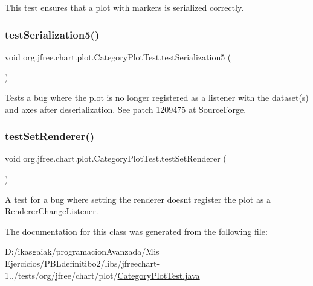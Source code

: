 This test ensures that a plot with markers is serialized correctly. \mbox{\label{classorg_1_1jfree_1_1chart_1_1plot_1_1_category_plot_test_a8caf2a503b37538507e3f8e52a79a802}} 
\subsubsection{\texorpdfstring{test\+Serialization5()}{testSerialization5()}}
{\footnotesize\ttfamily void org.\+jfree.\+chart.\+plot.\+Category\+Plot\+Test.\+test\+Serialization5 (\begin{DoxyParamCaption}{ }\end{DoxyParamCaption})}

Tests a bug where the plot is no longer registered as a listener with the dataset(s) and axes after deserialization. See patch 1209475 at Source\+Forge. \mbox{\label{classorg_1_1jfree_1_1chart_1_1plot_1_1_category_plot_test_af5f542ffedbd38a773604a92657ed276}} 
\subsubsection{\texorpdfstring{test\+Set\+Renderer()}{testSetRenderer()}}
{\footnotesize\ttfamily void org.\+jfree.\+chart.\+plot.\+Category\+Plot\+Test.\+test\+Set\+Renderer (\begin{DoxyParamCaption}{ }\end{DoxyParamCaption})}

A test for a bug where setting the renderer doesn\textquotesingle{}t register the plot as a Renderer\+Change\+Listener. 

The documentation for this class was generated from the following file\+:\begin{DoxyCompactItemize}
\item 
D\+:/ikasgaiak/programacion\+Avanzada/\+Mis Ejercicios/\+P\+B\+Ldefinitibo2/libs/jfreechart-\/1../tests/org/jfree/chart/plot/\mbox{\hyperlink{_category_plot_test_8java}{Category\+Plot\+Test.\+java}}\end{DoxyCompactItemize}
